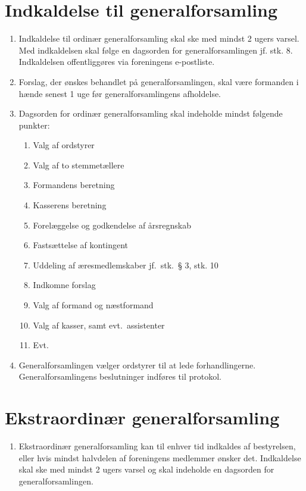 \documentclass[a4paper, 10pt]{article}
\newenvironment{stykenum}{
  \begin{enumerate}[%
    label=Stk.~\arabic*:, ref=\textsection~\theenumi~Stk.~\arabic*, start=1]
}{\end{enumerate}}
\begin{document}
\section{Indkaldelse til generalforsamling}
\begin{stykenum}
    \item Indkaldelse til ordinær generalforsamling skal ske med mindst 2 ugers
        varsel. Med indkaldelsen skal følge en dagsorden for generalforsamlingen
        jf. stk. 8. Indkaldelsen offentliggøres via foreningens e-postliste.

    \item Forslag, der ønskes behandlet på generalforsamlingen, skal være
        formanden i hænde senest 1 uge før generalforsamlingens afholdelse.

    \item Dagsorden for ordinær generalforsamling skal indeholde mindst følgende
        punkter:
        \begin{enumerate}[label=\arabic*.]
            \item Valg af ordstyrer
            \item Valg af to stemmetællere
            \item Formandens beretning
            \item Kasserens beretning
            \item Forelæggelse og godkendelse af årsregnskab
            \item Fastsættelse af kontingent
            \item Uddeling af æresmedlemskaber jf.~stk.~§ 3, stk. 10
            \item Indkomne forslag
            \item Valg af formand og næstformand
            \item Valg af kasser, samt evt.\ assistenter
            \item Evt.
        \end{enumerate}

    \item Generalforsamlingen vælger ordstyrer til at lede forhandlingerne.
        Generalforsamlingens beslutninger indføres til protokol.
\end{stykenum}

\section{Ekstraordinær generalforsamling}
\begin{stykenum}
    \item Ekstraordinær generalforsamling kan til enhver tid indkaldes af
        bestyrelsen, eller hvis mindst halvdelen af foreningens medlemmer ønsker
        det. Indkaldelse skal ske med mindst 2 ugers varsel og skal indeholde en
        dagsorden for generalforsamlingen.
\end{stykenum}
\end{document}
